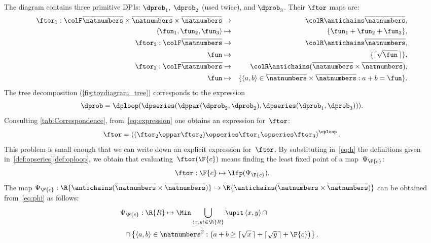 The diagram contains three primitive DPIs: $\dprob_{1},$
$\dprob_{2}$ (used twice), and $\dprob_{3}$. Their $\ftor$ maps
are:
\begin{eqnarray*}
  \ftor_{1}:{\colF\overline{\natnumbers}\times\overline{\natnumbers}\times\overline{\natnumbers}} & \rightarrow & {\colR\antichains\overline{\natnumbers}},\\
  \left\langle \fun_{1},\fun_{2},\fun_{3}\right\rangle  & \mapsto & \{\fun_{1}+\fun_{2}+\fun_{3}\},\\
  \ftor_{2}:{\colF\overline{\natnumbers}} & \rightarrow & {\colR\antichains\overline{\natnumbers}},\\
  \fun& \mapsto & \{\lceil\sqrt{\fun}\,\rceil\},\\
  \ftor_{3}:{\colF\overline{\natnumbers}} & \rightarrow & {\colR\antichains(\overline{\natnumbers}\times\overline{\natnumbers})},\\
  \fun& \mapsto & \{\left\langle a,b\right\rangle \in\overline{\natnumbers}\times\overline{\natnumbers}:a+b=\fun\}.
\end{eqnarray*}
The tree decomposition (\cref{fig:toydiagram_tree}) corresponds to
the expression
\begin{equation}
  \dprob=\dploop(\dpseries(\dppar(\dprob_{2},\dprob_{2}),\dpseries(\dprob_{1},\dprob_{3}))).\label{eq:expression}
\end{equation}
Consulting \cref{tab:Correspondence}, from~\cref{eq:expression}
one obtains an expression for~$\ftor$:
\begin{equation}
  \ftor=\left((\ftor_{2}\oppar\ftor_{2})\opseries\ftor_{1}\opseries\ftor_{3}\right)^{\oploop}.\label{eq:h}
\end{equation}
This problem is small enough that we can write down an explicit expression
for~$\ftor$. By substituting in~\cref{eq:h} the definitions given in~\cref{def:opseries}\textendash\ref{def:oploop}, we obtain that
evaluating~$\ftor(\F{c})$ means finding the least fixed point of a map~$\Psi_{\F{c}}$:
\[
  \ftor:\F{c}\mapsto\lfp(\Psi_{\F{c}}).
\]
The map $\Psi_{\F{c}}:\R{\antichains(\overline{\natnumbers}\times\overline{\natnumbers})}\rightarrow\R{\antichains(\overline{\natnumbers}\times\overline{\natnumbers})}$
can be obtained from~\cref{eq:phi} as follows:
\begin{equation}
  \Psi_{\F{c}}:\R{R}\mapsto\Min\bigcup_{\left\langle x,y\right\rangle \in\R{R}}\upit\left\langle x,y\right\rangle \cap\qquad\qquad\qquad\qquad
\end{equation}
\begin{equation}
  \cap\left\{ \left\langle a,b\right\rangle \in\natnumbers^{2}:\left(a+b\geq\lceil\sqrt{x}\,\rceil+\lceil\sqrt{y}\,\rceil+\F{c}\right)\right\}.
\end{equation}


